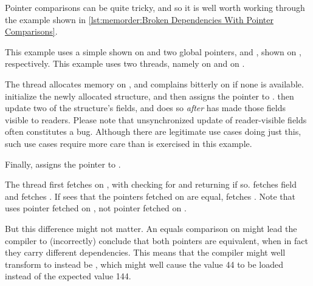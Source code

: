Pointer comparisons can be quite tricky, and so it is well worth working
through the example shown in
\cref{lst:memorder:Broken Dependencies With Pointer Comparisons}.
\begin{fcvref}
This example uses a simple  shown on 
and two global pointers,  and , shown on ,
respectively.
This example uses two threads, namely  on
 and  on .
\end{fcvref}

\begin{fcvref}
The  thread allocates memory on , and complains
bitterly on  if none is available.
 initialize the newly allocated structure,
and then  assigns the pointer to .
 then update two of the structure's fields, and does
so \emph{after}  has made those fields visible to readers.
Please note that unsynchronized update of reader-visible fields
often constitutes a bug.
Although there are legitimate use cases doing just this, such use cases
require more care than is exercised in this example.

Finally,  assigns the pointer to .
\end{fcvref}

\begin{fcvref}
The  thread first fetches  on , with
 checking for  and returning if so.
 fetches field  and
 fetches .
If  sees that the pointers fetched on 
are equal,  fetches .
Note that  uses pointer  fetched on , not
pointer  fetched on .

But this difference might not matter.
An equals comparison on  might lead the compiler to (incorrectly)
conclude that both pointers are equivalent, when in fact they carry
different dependencies.
This means that the compiler might well transform  to instead
be , which might well cause the value 44 to be loaded
instead of the expected value 144.
\end{fcvref}

